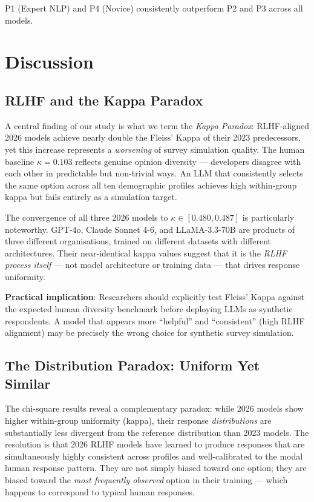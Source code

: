 \documentclass[11pt,a4paper]{article}
\begin{document}
P1 (Expert NLP) and P4 (Novice) consistently outperform P2 and P3 across all
models.

\section{Discussion}
\label{sec:discussion}

\subsection{RLHF and the Kappa Paradox}

A central finding of our study is what we term the \emph{Kappa Paradox}: RLHF-aligned
2026 models achieve nearly double the Fleiss' Kappa of their 2023 predecessors,
yet this increase represents a \emph{worsening} of survey simulation quality.
The human baseline $\kappa = 0.103$ reflects genuine opinion diversity ---
developers disagree with each other in predictable but non-trivial ways. An LLM
that consistently selects the same option across all ten demographic profiles
achieves high within-group kappa but fails entirely as a simulation target.

The convergence of all three 2026 models to $\kappa \in [0.480, 0.487]$ is
particularly noteworthy. GPT-4o, Claude Sonnet 4-6, and LLaMA-3.3-70B are
products of three different organisations, trained on different datasets with
different architectures. Their near-identical kappa values suggest that it is
the \emph{RLHF process itself} --- not model architecture or training data ---
that drives response uniformity.

\textbf{Practical implication}: Researchers should explicitly test Fleiss'
Kappa against the expected human diversity benchmark before deploying LLMs as
synthetic respondents. A model that appears more ``helpful'' and ``consistent''
(high RLHF alignment) may be precisely the wrong choice for synthetic survey
simulation.

\subsection{The Distribution Paradox: Uniform Yet Similar}

The chi-square results reveal a complementary paradox: while 2026 models show
higher within-group uniformity (kappa), their response \emph{distributions} are
substantially less divergent from the reference distribution than 2023 models.
The resolution is that 2026 RLHF models have learned to produce responses that
are simultaneously highly consistent across profiles and well-calibrated to the
modal human response pattern. They are not simply biased toward one option; they
are biased toward the \emph{most frequently observed} option in their training ---
which happens to correspond to typical human responses.
\end{document}
